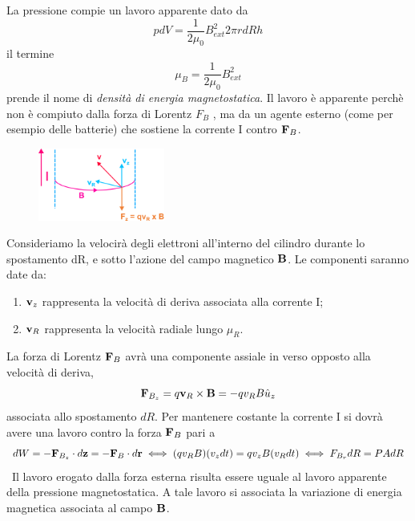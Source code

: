 La pressione compie un lavoro apparente dato da 
\begin{equation*}
	pdV =\frac{1}{2\mu_0}B_{ext}^2 2\pi rdRh
\end{equation*}
il termine
\begin{equation*}
	\mu_{B} = \frac{1}{2\mu_0}B_{ext}^2
\end{equation*}
prende il nome di \textit{densit\`a di energia magnetostatica}. Il lavoro \`e apparente perch\`e non \`e compiuto dalla forza di Lorentz $F_B$ , ma da un agente esterno (come per esempio delle batterie) che sostiene la corrente I contro $\bold{F}_{B}$.

\newpage

\begin{figure}  %
    \centering
    \includegraphics[width=0.37\textwidth]{images/magnergy1}  %
\end{figure}
Consideriamo la velocir\`a degli elettroni all'interno del cilindro durante lo spostamento dR, e sotto l'azione del campo magnetico $\bold{B}$. Le componenti saranno date da:
\begin{enumerate}
	\item $\bold{v}_{z}$  rappresenta la velocit\`a di deriva associata alla corrente I;
	\item $\bold{v}_{R}$ rappresenta la velocit\`a radiale lungo $\mu_{R}$.  
\end{enumerate}

La forza di Lorentz $\bold{F}_{B}$ avr\`a una componente assiale in verso opposto alla velocit\`a di deriva,
\begin{equation*}
	\bold{F}_{B_z} = q \bold{v}_{R} \times \bold{B} = -qv_{R}B \hat{u}_{z}
\end{equation*}
 associata allo spostamento $dR$. Per mantenere costante la corrente I si dovr\`a avere una lavoro contro la forza $\bold{F}_{B}$ pari a 
\begin{equation*}
	dW = - \bold{F}_{B_z} \cdot d\bold{z} = -\bold{F}_{B} \cdot d\bold{r} \iff (qv_{R}B) (v_zdt) = q v_{z}B(v_R dt)  \iff F_{B_r} dR = PAdR
\end{equation*}\
Il lavoro erogato dalla forza esterna risulta essere uguale al lavoro apparente della pressione magnetostatica. A tale lavoro si associata la variazione di energia magnetica associata al campo $\bold{B}$.

